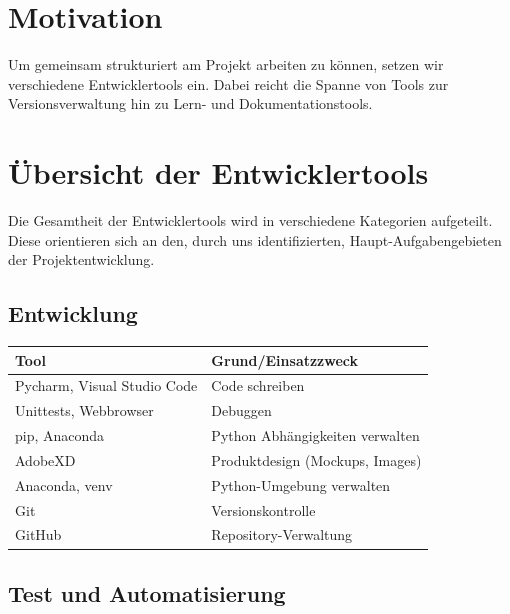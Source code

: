 \documentclass[a4paper,11pt]{scrartcl}
\begin{document}


\section{Motivation}

Um gemeinsam strukturiert am Projekt arbeiten zu können, setzen wir verschiedene Entwicklertools ein.
Dabei reicht die Spanne von Tools zur Versionsverwaltung hin zu Lern- und Dokumentationstools.

\section{Übersicht der Entwicklertools}

Die Gesamtheit der Entwicklertools wird in verschiedene Kategorien aufgeteilt.
Diese orientieren sich an den, durch uns identifizierten, Haupt-Aufgabengebieten der Projektentwicklung.

\subsection{Entwicklung}

\begin{table}[H]
\begin{center}
\begin{tabular}{|L{4cm}|L{8cm}|}
\hline
\textbf{Tool} &\textbf{Grund/Einsatzzweck} \\ \hline
Pycharm, Visual Studio Code & Code schreiben \\ \hline
Unittests, Webbrowser & Debuggen\\ \hline
pip, Anaconda & Python Abhängigkeiten verwalten\\ \hline
AdobeXD & Produktdesign (Mockups, Images)\\ \hline
Anaconda, venv & Python-Umgebung verwalten\\ \hline
Git & Versionskontrolle\\ \hline
GitHub & Repository-Verwaltung\\ \hline    
\end{tabular}
\end{center}
\end{table}

\subsection{Test und Automatisierung}
\end{document}
